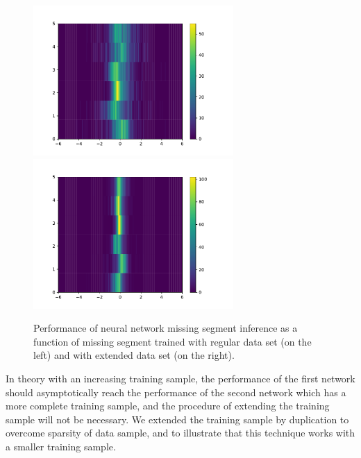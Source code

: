 \documentclass[12pt]{article}
\begin{document}
\begin{figure}[!ht]
\begin{center}
 \includegraphics[width=3.0in]{images/figure_2d_r.pdf}
 \includegraphics[width=3.0in]{images/figure_2d_n.pdf}
\caption {Performance of neural network missing segment inference as a function of missing segment trained with regular data  set (on the left) and with extended data set (on the right).}
 \label{ml:results2d}
 \end{center}
\end{figure}

In theory with an increasing training sample, the performance of the first network should asymptotically reach the performance of the second network which has a more complete training sample, and the procedure of extending the training sample will not be necessary. We extended the training sample by duplication to overcome sparsity of data sample, and to illustrate that this technique works
with a smaller training sample.

\newpage


\end{document}
